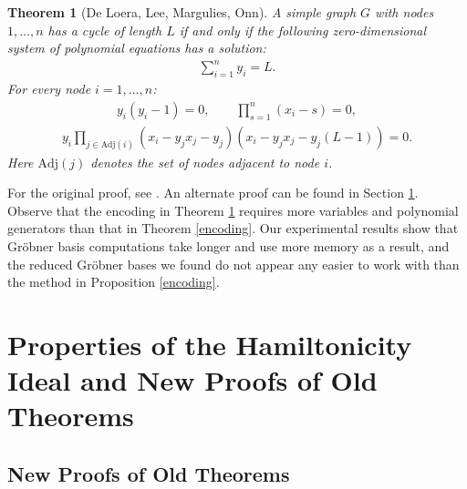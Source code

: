 \documentclass{amsart}
\renewcommand{\(}{\left(}
\renewcommand{\)}{\right)}
\newcommand{\<}{\langle}
\renewcommand{\>}{\rangle}
\newtheorem{theorem}{Theorem}[section]
\theoremstyle{definition}
\theoremstyle{remark}
\begin{document}
\begin{theorem}[De Loera, Lee, Margulies, Onn] \label{altencoding}
A simple graph $G$ with nodes $1, \ldots, n$ has a cycle of length $L$ if and only if the following zero-dimensional system of polynomial equations has a solution:
\begin{gather} \label{thm11-1}
	\sum_{i=1}^n y_i = L.
\end{gather}
For every node $i = 1, \ldots, n$:
\begin{gather} \label{thm11-2}
	y_i (y_i - 1) = 0, \qquad \prod_{s=1}^n (x_i - s) = 0,
\end{gather}
\begin{gather} \label{thm11-3}
	y_i \prod_{j \in \mathrm{Adj}(i)} (x_i - y_j x_j - y_j) (x_i - y_j x_j - y_j(L-1)) = 0.
\end{gather}
Here $\mathrm{Adj}(j)$ denotes the set of nodes adjacent to node $i$.
\end{theorem}

For the original proof, see \cite{deloera07}. An alternate proof can be found in Section \ref{newprops}. Observe that the encoding in Theorem \ref{altencoding} requires more variables and polynomial generators than that in Theorem \ref{encoding}. Our experimental results show that Gr\"obner basis computations take longer and use more memory as a result, and the reduced Gr\"obner bases we found do not appear any easier to work with than the method in Proposition \ref{encoding}.

\section{Properties of the Hamiltonicity Ideal and New Proofs of Old Theorems} \label{newprops}

\subsection{New Proofs of Old Theorems}
\end{document}
